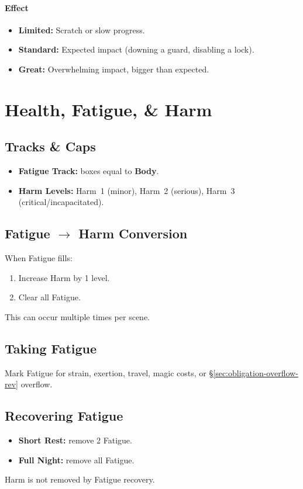 \paragraph{Effect}
\begin{itemize}
  \item \textbf{Limited:} Scratch or slow progress.
  \item \textbf{Standard:} Expected impact (downing a guard, disabling a lock).
  \item \textbf{Great:} Overwhelming impact, bigger than expected.
\end{itemize}

\section{Health, Fatigue, \& Harm}
\label{sec:health-fatigue-harm-rev}

\subsection*{Tracks \& Caps}
\begin{itemize}
  \item \textbf{Fatigue Track:} boxes equal to \textbf{Body}.
  \item \textbf{Harm Levels:} Harm~1 (minor), Harm~2 (serious), Harm~3 (critical/incapacitated).
\end{itemize}

\subsection*{Fatigue $\rightarrow$ Harm Conversion}
When Fatigue fills:
\begin{enumerate}
  \item Increase Harm by 1 level.
  \item Clear all Fatigue.
\end{enumerate}
This can occur multiple times per scene.

\subsection*{Taking Fatigue}
Mark Fatigue for strain, exertion, travel, magic costs, or \S\ref{sec:obligation-overflow-rev} overflow.

\subsection*{Recovering Fatigue}
\begin{itemize}
  \item \textbf{Short Rest:} remove 2 Fatigue.
  \item \textbf{Full Night:} remove all Fatigue.
\end{itemize}
Harm is not removed by Fatigue recovery.


